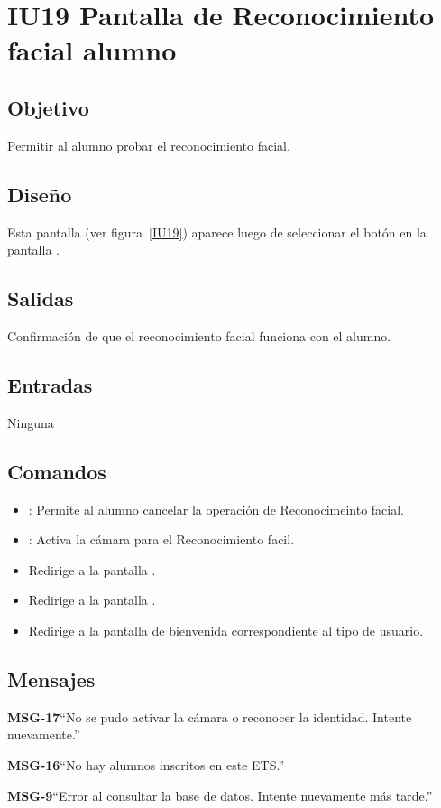 \section{IU19 Pantalla de Reconocimiento facial alumno}

\subsection{Objetivo}
Permitir al alumno probar el reconocimiento facial.

\subsection{Diseño}
Esta pantalla  (ver figura~\ref{IU19}) aparece luego de seleccionar el botón  en la pantalla .


\subsection{Salidas}
Confirmación de que el reconocimiento facial funciona con el alumno.

\subsection{Entradas}
Ninguna

\subsection{Comandos}
\begin{itemize}
    \item {}: Permite al alumno cancelar la operación de Reconocimeinto facial.
    \item {}: Activa la cámara para el Reconocimiento facil. 
    \item {} Redirige a la pantalla .
    \item {} Redirige a la pantalla .
    \item {} Redirige a la pantalla de bienvenida correspondiente al tipo de usuario.
\end{itemize}

\subsection{Mensajes}

\begin{Citemize}
    \item {\bf MSG-17}{``No se pudo activar la cámara o reconocer la identidad. Intente nuevamente.''}
    \item {\bf MSG-16}{``No hay alumnos inscritos en este ETS.''}
    \item {\bf MSG-9}{``Error al consultar la base de datos. Intente nuevamente más tarde.''}
\end{Citemize}